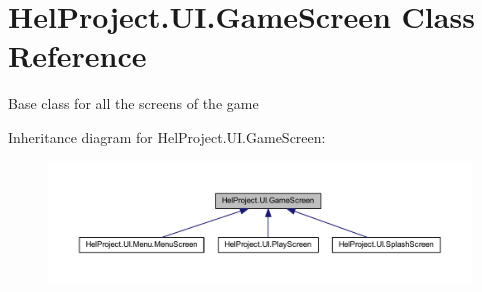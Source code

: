 \hypertarget{class_hel_project_1_1_u_i_1_1_game_screen}{}\section{Hel\+Project.\+U\+I.\+Game\+Screen Class Reference}
\label{class_hel_project_1_1_u_i_1_1_game_screen}


Base class for all the screens of the game  




Inheritance diagram for Hel\+Project.\+U\+I.\+Game\+Screen\+:\nopagebreak
\begin{figure}[H]
\begin{center}
\leavevmode
\includegraphics[width=350pt]{class_hel_project_1_1_u_i_1_1_game_screen__inherit__graph}
\end{center}
\end{figure}
